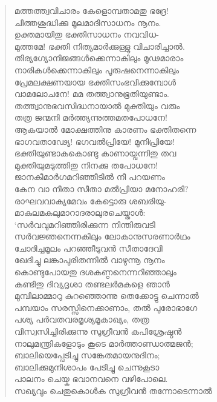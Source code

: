 \begin{verse}
മത്തത്ത്വവിചാരം കേളൊമ്പതാമതു ഭദ്രേ!\\
ചിത്തശുദ്ധിക്കു മൂലമാദിസാധനം നൂനം.\\
ഉക്തമായിതു ഭക്തിസാധനം നവവിധ-\\
മുത്തമേ! ഭക്തി നിത്യമാര്‍ക്കുള്ളു വിചാരിച്ചാല്‍.\\
തിര്യഗ്യോനിജങ്ങള്‍ക്കെന്നാകിലും മൂഢമാരാം\\
നാരികള്‍ക്കെന്നാകിലും പൂരുഷനെന്നാകിലും\\
പ്രേമലക്ഷണയായ ഭക്തിസംഭവിക്കുമ്പോള്‍\\
വാമലോചനേ! മമ തത്ത്വാനുഭൂതിയുണ്ടാം.\\
തത്ത്വാനുഭവസിദ്ധനായാല്‍ മുക്തിയും വരും\\
തത്ര ജന്മനി മര്‍ത്ത്യന്നുത്തമതപോധനേ!\\
ആകയാല്‍ മോക്ഷത്തിനു കാരണം ഭക്തിതന്നെ\\
ഭാഗവതാഢ്യേ! ഭഗവല്‍പ്രിയേ! മുനിപ്രിയേ!\\
ഭക്തിയുണ്ടാകകൊണ്ടു കാണായ്വന്നിതു തവ\\
മുക്തിയുമടുത്തിതു നിനക്കു തപോധനേ!\\
ജാനകീമാര്‍ഗമറിഞ്ഞീടില്‍ നീ പറയണം\\
കേന വാ നീതാ സീതാ മല്‍പ്രിയാ മനോഹരി?\\
രാഘവവാക്യമേവം കേട്ടൊരു ശബരിയു-\\
മാകുലമകലുമാറാദരാലുരചെയ്താള്‍:\\
‘സര്‍വവുമറിഞ്ഞിരിക്കുന്ന നിന്തിരുവടി\\
സര്‍വജ്ഞനെന്നകിലും ലോകാനുസരണാര്‍ഥം\\
ചോദിച്ചമൂലം പറഞ്ഞീടുവന്‍ സീതാദേവി\\
ഖേദിച്ചു ലങ്കാപുരിതന്നില്‍ വാഴുന്നൂ നൂനം\\
കൊണ്ടുപോയതു ദശകണ്ഠനെന്നറിഞ്ഞാലും\\
കണ്ടിതു ദിവ്യദൃശാ തണ്ടലര്‍മകളെ ഞാന്‍\\
മുമ്പിലാമ്മാറു കുറഞ്ഞൊന്നു തെക്കോട്ടു ചെന്നാല്‍\\
പമ്പയാം സരസ്സിനെക്കാണാം, തല്‍ പുരോഭാഗേ\\
പശ്യ പര്‍വതവരമൃശ്യമൂകാഖ്യം, തത്ര\\
വിസ്വസിച്ചിരിക്കുന്നു സുഗ്രീവന്‍ കപിശ്രേഷ്ഠന്‍\\
നാലുമന്ത്രികളോടും കൂടെ മാര്‍ത്താണ്ഡാത്മജന്‍;\\
ബാലിയെപ്പേടിച്ചു സങ്കേതമായനുദിനം;\\
ബാലിക്കുമുനിശാപം പേടിച്ചു ചെന്നുകൂടാ\\
പാലനം ചെയ്ക ഭവാനവനെ വഴിപോലെ.\\
സഖ്യവും ചെതുകൊള്‍ക സുഗ്രീവന്‍ തന്നോടെന്നാല്‍\\

\end{verse}

